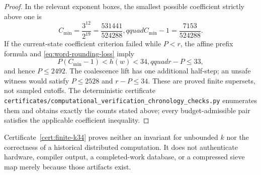 \begin{proof}
In the relevant exponent boxes, the smallest possible coefficient strictly
above one is
\[
 C_{\min}=\frac{3^{12}}{2^{19}}
 =\frac{531441}{524288},qquad
 C_{\min}-1=\frac{7153}{524288}.
\]
If the current-state coefficient criterion failed while $P<r$, the affine
prefix formula and \eqref{eq:word-rounding-loss} imply
\[
 P(C_{\min}-1)<h(w)<34,qquad r-P\le33,
\]
and hence $P\le2492$.  The coalescence lift has one additional half-step; an
unsafe witness would satisfy $P\le2528$ and $r-P\le34$.  These are proved
finite supersets, not sampled cutoffs.  The deterministic certificate
\nolinkurl{certificates/computational_verification_chronology_checks.py}
enumerates them and obtains exactly the counts stated above; every
budget-admissible pair satisfies the applicable coefficient inequality.
\end{proof}

\begin{nonclaim}
Certificate~\ref{cert:finite-k34} proves neither an invariant for unbounded
$k$ nor the correctness of a historical distributed computation.  It does
not authenticate hardware, compiler output, a completed-work database, or a
compressed sieve map merely because those artifacts exist.
\end{nonclaim}

